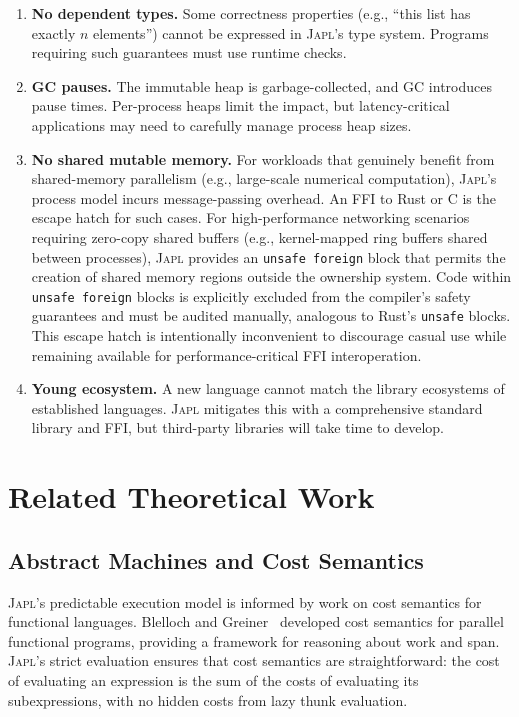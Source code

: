 \documentclass[11pt,twocolumn]{article}
\newcommand{\japl}{\textsc{Japl}}
\begin{document}
\begin{enumerate}[leftmargin=*]
\item \textbf{No dependent types.} Some correctness properties (e.g., ``this list has exactly $n$ elements'') cannot be expressed in \japl{}'s type system. Programs requiring such guarantees must use runtime checks.
\item \textbf{GC pauses.} The immutable heap is garbage-collected, and GC introduces pause times. Per-process heaps limit the impact, but latency-critical applications may need to carefully manage process heap sizes.
\item \textbf{No shared mutable memory.} For workloads that genuinely benefit from shared-memory parallelism (e.g., large-scale numerical computation), \japl{}'s process model incurs message-passing overhead. An FFI to Rust or C is the escape hatch for such cases.
For high-performance networking scenarios requiring zero-copy shared buffers (e.g., kernel-mapped ring buffers shared between processes), \japl{} provides an \texttt{unsafe foreign} block that permits the creation of shared memory regions outside the ownership system.
Code within \texttt{unsafe foreign} blocks is explicitly excluded from the compiler's safety guarantees and must be audited manually, analogous to Rust's \texttt{unsafe} blocks.
This escape hatch is intentionally inconvenient to discourage casual use while remaining available for performance-critical FFI interoperation.
\item \textbf{Young ecosystem.} A new language cannot match the library ecosystems of established languages. \japl{} mitigates this with a comprehensive standard library and FFI, but third-party libraries will take time to develop.
\end{enumerate}

\section{Related Theoretical Work}
\label{sec:related-theory}

\subsection{Abstract Machines and Cost Semantics}

\japl{}'s predictable execution model is informed by work on cost semantics for functional languages.
Blelloch and Greiner~\citep{blelloch1996cost} developed cost semantics for parallel functional programs, providing a framework for reasoning about work and span.
\japl{}'s strict evaluation ensures that cost semantics are straightforward: the cost of evaluating an expression is the sum of the costs of evaluating its subexpressions, with no hidden costs from lazy thunk evaluation.
\end{document}

